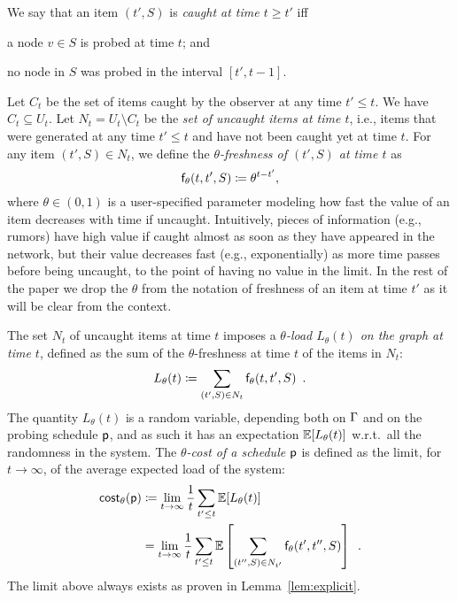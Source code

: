 We say that an item $(t',S)$ is \emph{caught at time $t\ge t'$} iff
\begin{enumerate*}
	\item a node $v\in S$ is probed at time $t$; and
	\item no node in $S$ was probed in the interval $[t',t-1]$.
\end{enumerate*}

Let $C_t$ be the set of items caught by the observer at any time $t'\le t$. We
have $C_t\subseteq U_t$. Let $N_t= U_t\setminus C_t$ be the \emph{set of
uncaught items at time $t$}, i.e., items that were generated at any time
$t'\le t$ and have not been caught yet at time $t$. For any item $(t',S)\in
N_t$, we define the \emph{$\theta$-freshness of $(t',S)$ at time $t$} as
\[
	\mathsf{f}_\theta(t,t',S)\coloneqq\theta^{t-t'},
\]
where $\theta\in(0,1)$ is a user-specified parameter modeling how fast the
value of an item decreases with time if uncaught. Intuitively, pieces of
information (e.g., rumors) have high value if caught almost as soon as they have
appeared in the network, but their value decreases fast (e.g., exponentially) as
more time passes before being uncaught, to the point of having no value in the
limit. In the rest of the paper we drop the $\theta$ from the notation of
freshness of an item at time $t'$ as it will be clear from the context.

 The set $N_t$ of uncaught items
at time $t$ imposes a \emph{$\theta$-load $L_\theta(t)$ on the graph at time
$t$}, defined as the sum of the $\theta$-freshness at time $t$ of the items in
$N_t$:
\[
	L_\theta(t)\coloneqq\sum_{(t',S)\in N_t} \mathsf{f}_\theta(t,t',S)\enspace.
\]
The quantity $L_\theta(t)$ is a random variable, depending both on $\Gamma$ and on
the probing schedule $\mathsf{p}$, and as such it has an expectation
$\mathbb{E}[L_\theta(t)]$ w.r.t.~all the randomness in the system. The
\emph{$\theta$-cost of a schedule $\mathsf{p}$} is defined as the limit, for
$t\rightarrow\infty$, of the average expected load of the system:
\begin{align*}
	\mathsf{cost}_\theta(\mathsf{p})&\coloneqq\lim_{t\rightarrow\infty}\frac{1}{t}\sum_{t'\le
	t}\mathbb{E}[L_\theta(t)]\\
	&=\lim_{t\rightarrow\infty}\frac{1}{t}\sum_{t'\le
	t}\mathbb{E}\left[\sum_{(t'',S)\in N_{t'}}\mathsf{f}_\theta(t',t'',S)\right]\enspace.
\end{align*}
The limit above always exists as proven in Lemma~\ref{lem:explicit}.

